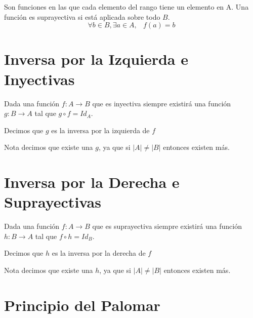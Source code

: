 \documentclass[12pt, fleqn]{report}                             %
\DeclareMathOperator \Space {\quad}                             %
\DeclareMathOperator \MiniSpace {\;}                            %
\begin{document}
                Son funciones en las que cada elemento del rango tiene un elemento en A.
                Una función es suprayectiva si está aplicada sobre todo $B$.
                \begin{equation*}
                    \forall b \in B, \exists a \in A, \MiniSpace f(a) = b
                \end{equation*}


        \section{Inversa por la Izquierda e Inyectivas}

            Dada una función $f: A \to B$ que es inyectiva siempre existirá una función
            $g: B \to A$ tal que $g \circ f = Id_A$.

            Decimos que $g$ es la inversa por la izquierda de $f$

            Nota decimos que existe una $g$, ya que si $|A| \neq |B|$ entonces existen más.


        \section{Inversa por la Derecha e Suprayectivas}

            Dada una función $f: A \to B$ que es suprayectiva siempre existirá una función
            $h: B \to A$ tal que $f \circ h = Id_B$.

            Decimos que $h$ es la inversa por la derecha de $f$

            Nota decimos que existe una $h$, ya que si $|A| \neq |B|$ entonces existen más.





        \clearpage
        \section{Principio del Palomar}
\end{document}
